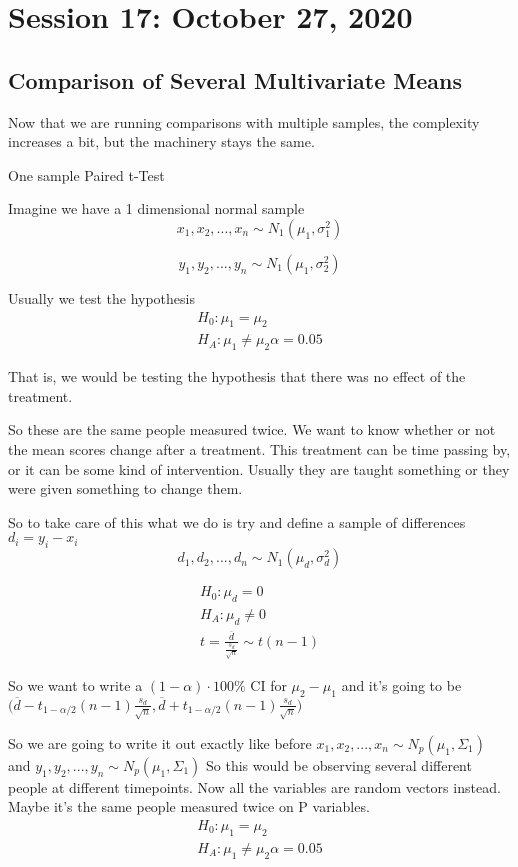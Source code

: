 \chapter{Session 17: October 27, 2020}
\section{Comparison of Several Multivariate Means}
Now that we are running comparisons with multiple samples, the complexity increases a bit, but the machinery stays the same.

One sample Paired t-Test

Imagine we have a 1 dimensional normal sample
\[x_1,x_2,...,x_n \sim N_1(\mu_1,\sigma_1^2)\]

\[y_1,y_2,...,y_n \sim N_1(\mu_1,\sigma_2^2)\]

Usually we test the hypothesis
\begin{gather*}
    H_0: \mu_1=\mu_2 \\
    H_A : \mu_1 \neq \mu_2 \alpha = 0.05
\end{gather*}

That is, we would be testing the hypothesis that there was no effect of the treatment.

So these are the same people measured twice. We want to know whether or not the mean scores change after a treatment. This treatment can be time passing by, or it can be some kind of intervention. Usually they are taught something or they were given something to change them.

So to take care of this what we do is try and define a sample of differences
$d_i = y_i -x_i$
\[d_1,d_2,...,d_n \sim N_1(\mu_d,\sigma_d^2)\]

\begin{gather*}
    H_0: \mu_d = 0 \\
    H_A: \mu_d \neq 0\\
    t = \frac{\overline{d}}{\frac{s_d}{\sqrt{n}}}\sim t(n-1)
\end{gather*}

 So we want to  write a $(1-\alpha)\cdot 100\%$ CI for $\mu_2-\mu_1$ and it's going to be $\big(\overline{d}-t_{1-\alpha/2}(n-1)\frac{s_d}{\sqrt{n}},\overline{d}+t_{1-\alpha/2}(n-1)\frac{s_d}{\sqrt{n}}\big)$
 
 So we are going to write it out exactly like before
 \(x_1,x_2,...,x_n \sim N_p(\mu_1,\Sigma_1)\) and 
 \(y_1,y_2,...,y_n \sim N_p(\mu_1,\Sigma_1)\) So this would be observing several different people at different timepoints. Now all the variables are random vectors instead. Maybe it's the same people measured twice on P variables.
 \begin{gather*}
    H_0: \mu_1=\mu_2 \\
    H_A : \mu_1 \neq \mu_2 \alpha = 0.05
\end{gather*}

